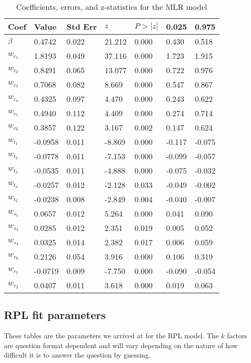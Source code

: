 \documentclass[a4paper,12pt]{article}
\begin{document}
\begin{table}[H]
\centering
\begin{tabular}{|l|l|l|l|l|l|l|}
\hline
\textbf{Coef} & \textbf{Value} & \textbf{Std Err} & \textbf{$z$} & \textbf{$P > |z|$} &\textbf{ 0.025 }& \textbf{0.975 }\\
\hline
$\beta$ & 0.4742 & 0.022  & 21.212  & 0.000  &  0.430  & 0.518 \\
\hline
$w_{c_1}$ & 1.8193 & 0.049 & 37.116 & 0.000 & 1.723 & 1.915\\
$w_{c_2}$ & 0.8491 & 0.065 & 13.077 & 0.000 & 0.722 & 0.976 \\
$w_{c_3}$ & 0.7068 & 0.082 & 8.669 & 0.000 & 0.547 & 0.867 \\
$w_{c_4}$ & 0.4325 & 0.097 & 4.470 & 0.000 & 0.243 & 0.622 \\
$w_{c_5}$ & 0.4940 & 0.112 & 4.409 & 0.000 & 0.274 & 0.714 \\
$w_{c_6}$ & 0.3857 & 0.122 & 3.167 & 0.002 & 0.147 & 0.624 \\
\hline
$w_{t_1}$ &  -0.0958 & 0.011 & -8.869 & 0.000 & -0.117 & -0.075 \\
$w_{t_2}$ &  -0.0778 & 0.011 & -7.153 & 0.000 & -0.099 & -0.057 \\
$w_{t_3}$ & -0.0535 & 0.011 & -4.888 & 0.000 & -0.075 & -0.032 \\
$w_{t_4}$ & -0.0257 & 0.012 & -2.128 & 0.033 & -0.049 & -0.002 \\
$w_{t_5}$ & -0.0238 & 0.008 & -2.849 & 0.004 & -0.040 & -0.007 \\
\hline
$w_{s_1}$ &  0.0657 & 0.012 & 5.264 & 0.000 & 0.041 & 0.090 \\
$w_{s_2}$ & 0.0285 & 0.012 & 2.351 & 0.019 & 0.005 & 0.052 \\
$w_{s_3}$ & 0.0325 & 0.014 & 2.382 & 0.017 & 0.006 & 0.059 \\
\hline
$w_{r_0}$ &  0.2126 & 0.054 & 3.916 & 0.000 & 0.106 & 0.319 \\
$w_{r_1}$ &  -0.0719 & 0.009 & -7.750 & 0.000 & -0.090 & -0.054 \\
$w_{r_2}$ & 0.0407 & 0.011 & 3.618 & 0.000 & 0.019 & 0.063 \\
\hline
\end{tabular}
\caption{Coefficients, errors, and z-statistics for the MLR model}
\end{table}

\subsection*{RPL fit parameters}
These tables are the parameters we arrived at for the RPL model. The $k$ factors are question format dependent and will vary depending on the nature of how difficult it is to answer the question by guessing.
\end{document}
